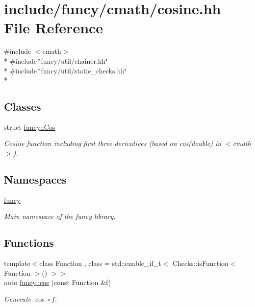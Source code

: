 \hypertarget{cosine_8hh}{\section{include/funcy/cmath/cosine.hh File Reference}
\label{cosine_8hh}
}
{\ttfamily \#include $<$cmath$>$}\\*
{\ttfamily \#include \char`\"{}funcy/util/chainer.\-hh\char`\"{}}\\*
{\ttfamily \#include \char`\"{}funcy/util/static\-\_\-checks.\-hh\char`\"{}}\\*
\subsection*{Classes}
\begin{DoxyCompactItemize}
\item 
struct \hyperlink{structfuncy_1_1Cos}{funcy\-::\-Cos}
\begin{DoxyCompactList}\small\item\em Cosine function including first three derivatives (based on cos(double) in $<$cmath$>$). \end{DoxyCompactList}\end{DoxyCompactItemize}
\subsection*{Namespaces}
\begin{DoxyCompactItemize}
\item 
\hyperlink{namespacefuncy}{funcy}
\begin{DoxyCompactList}\small\item\em Main namespace of the funcy library. \end{DoxyCompactList}\end{DoxyCompactItemize}
\subsection*{Functions}
\begin{DoxyCompactItemize}
\item 
{\footnotesize template$<$class Function , class  = std\-::enable\-\_\-if\-\_\-t$<$ Checks\-::is\-Function$<$ Function $>$() $>$$>$ }\\auto \hyperlink{group__CMathGroup_gaa9d6107852e7d6202c34f09bdbfaf8a2}{funcy\-::cos} (const Function \&f)
\begin{DoxyCompactList}\small\item\em Generate $ \cos\circ f $. \end{DoxyCompactList}\end{DoxyCompactItemize}

